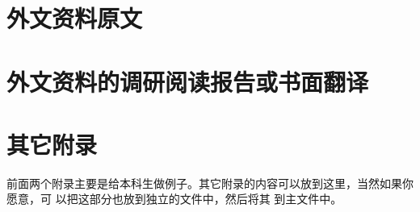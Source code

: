 
\chapter{外文资料原文}
\label{cha:engorg}



\chapter{外文资料的调研阅读报告或书面翻译}


\chapter{其它附录}
前面两个附录主要是给本科生做例子。其它附录的内容可以放到这里，当然如果你愿意，可
以把这部分也放到独立的文件中，然后将其 \verb|| 到主文件中。
